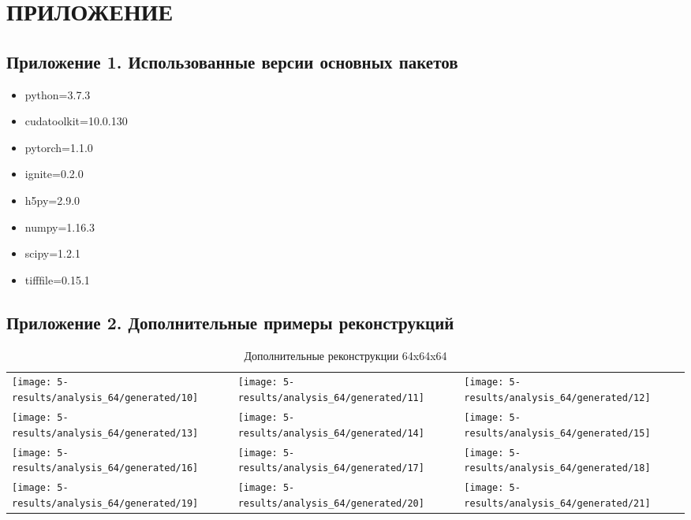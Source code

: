 \clearpage
\section*{\hfil ПРИЛОЖЕНИЕ \hfil}
	\subsection*{Приложение 1. Использованные версии основных пакетов}
		\begin{itemize}
			\item python=3.7.3
			\item cudatoolkit=10.0.130
			\item pytorch=1.1.0
			\item ignite=0.2.0
			\item h5py=2.9.0
			\item numpy=1.16.3
			\item scipy=1.2.1
			\item tifffile=0.15.1
		\end{itemize}
	
	\subsection*{Приложение 2. Дополнительные примеры реконструкций}
		
		\begin{table}[h!]
			\begin{center}
				\begin{tabular}{p{5cm} p{5cm} p{5cm}}
					\toprule
					\texttt{[image: 5-results/analysis\_64/generated/10]}
					&
					\texttt{[image: 5-results/analysis\_64/generated/11]}
					&
					\texttt{[image: 5-results/analysis\_64/generated/12]}
					\\
					\texttt{[image: 5-results/analysis\_64/generated/13]}
					&
					\texttt{[image: 5-results/analysis\_64/generated/14]}
					&
					\texttt{[image: 5-results/analysis\_64/generated/15]}
					\\
					\texttt{[image: 5-results/analysis\_64/generated/16]}
					&
					\texttt{[image: 5-results/analysis\_64/generated/17]}
					&
					\texttt{[image: 5-results/analysis\_64/generated/18]}
					\\
					\texttt{[image: 5-results/analysis\_64/generated/19]}
					&
					\texttt{[image: 5-results/analysis\_64/generated/20]}
					&
					\texttt{[image: 5-results/analysis\_64/generated/21]}
					\\
					\bottomrule
				\end{tabular}
				\caption{Дополнительные реконструкции 64x64x64}
				\label{8-gen-64}
			\end{center}
		\end{table}
	
